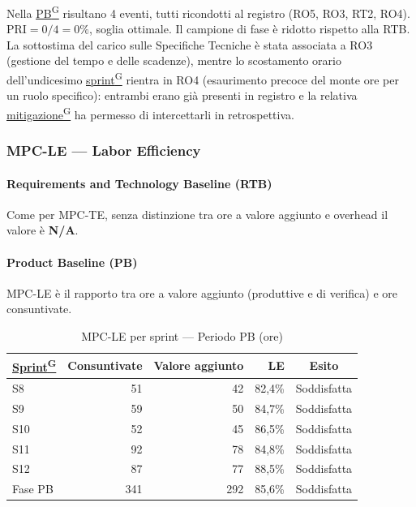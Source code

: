 \documentclass[a4paper,12pt]{article}
\providecommand{\glslink}[2]{\href{https://alittlebyte-19.github.io/Documentazione/glossario.html\#gls-#1}{\underline{#2}\textsuperscript{\scriptsize G}}}
\begin{document}
Nella \glslink{pb-product-baseline}{PB} risultano 4 eventi, tutti ricondotti al registro (RO5, RO3, RT2, RO4). $\text{PRI} = 0/4 = 0\%$, soglia ottimale. Il campione di fase è ridotto rispetto alla RTB. La sottostima del carico sulle Specifiche Tecniche è stata associata a RO3 (gestione del tempo e delle scadenze), mentre lo scostamento orario dell'undicesimo \glslink{sprint}{sprint} rientra in RO4 (esaurimento precoce del monte ore per un ruolo specifico): entrambi erano già presenti in registro e la relativa \glslink{mitigazione-dei-rischi}{mitigazione} ha permesso di intercettarli in retrospettiva.

\subsubsection{MPC-LE — Labor Efficiency}

\paragraph*{Requirements and Technology Baseline (RTB)} Come per MPC-TE, senza distinzione tra ore a valore aggiunto e overhead il valore è \textbf{N/A}.

\paragraph*{Product Baseline (PB)} MPC-LE è il rapporto tra ore a valore aggiunto (produttive e di verifica) e ore consuntivate.

\begin{table}[H]
\centering
{}
\begin{tabular}{|l|r|r|r|c|}
    \hline
    \rowcolor{gray!35}
    \textbf{\glslink{sprint}{Sprint}} & \textbf{Consuntivate} & \textbf{Valore aggiunto} & \textbf{LE} & \textbf{Esito} \\
    \hline
    S8 & 51 & 42 & 82,4\% & \textcolor{green!60!black}{Soddisfatta} \\
    S9 & 59 & 50 & 84,7\% & \textcolor{green!60!black}{Soddisfatta} \\
    S10 & 52 & 45 & 86,5\% & \textcolor{green!60!black}{Soddisfatta} \\
    S11 & 92 & 78 & 84,8\% & \textcolor{green!60!black}{Soddisfatta} \\
    S12 & 87 & 77 & 88,5\% & \textcolor{green!60!black}{Soddisfatta} \\
    \hline
    Fase PB & 341 & 292 & 85,6\% & \textcolor{green!60!black}{Soddisfatta} \\
    \hline
\end{tabular}
\caption{MPC-LE per sprint — Periodo PB (ore)}
\end{table}
\end{document}
